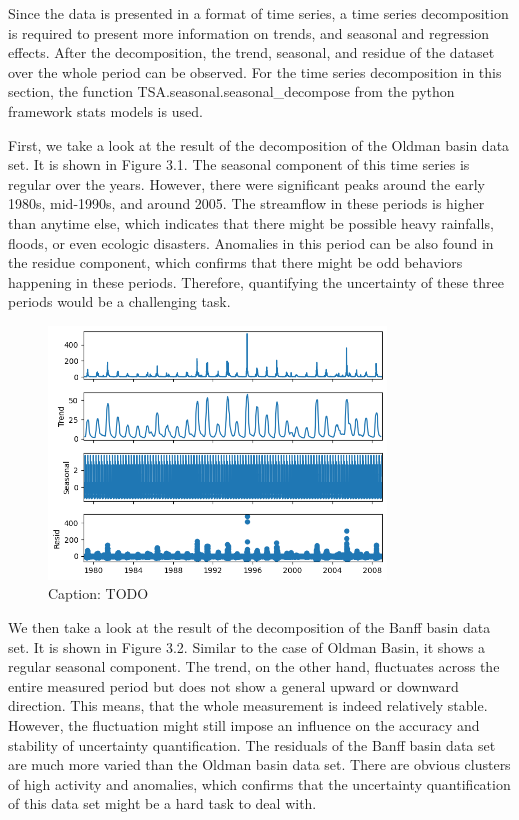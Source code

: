 Since the data is presented in a format of time series, a time series decomposition is required to present more information on trends, and seasonal and regression effects.\cite{time_series} After the decomposition, the trend, seasonal, and residue of the dataset over the whole period can be observed. For the time series decomposition in this section, the function TSA.seasonal.seasonal\_decompose from the python framework stats models is used.\cite{stat_models_decompose}

First, we take a look at the result of the decomposition of the Oldman basin data set. It is shown in Figure 3.1. The seasonal component of this time series is regular over the years. However, there were significant peaks around the early 1980s, mid-1990s, and around 2005. The streamflow in these periods is higher than anytime else, which indicates that there might be possible heavy rainfalls, floods\cite{hydrology}, or even ecologic disasters. Anomalies in this period can be also found in the residue component, which confirms that there might be odd behaviors happening in these periods. Therefore, quantifying the uncertainty of these three periods would be a challenging task.

\begin{figure}
    \centering
    \includegraphics[width=0.8\textwidth]{figures/dataset_time_series/Oldman.png}
    \captionsetup{width=.8\textwidth}
    \caption{Caption: TODO}
    \label{fig:enter-label}
\end{figure}


We then take a look at the result of the decomposition of the Banff basin data set. It is shown in Figure 3.2. Similar to the case of Oldman Basin, it shows a regular seasonal component. The trend, on the other hand, fluctuates across the entire measured period but does not show a general upward or downward direction. This means, that the whole measurement is indeed relatively stable. However, the fluctuation might still impose an influence on the accuracy and stability of uncertainty quantification. The residuals of the Banff basin data set are much more varied than the Oldman basin data set. There are obvious clusters of high activity and anomalies, which confirms that the uncertainty quantification of this data set might be a hard task to deal with.

